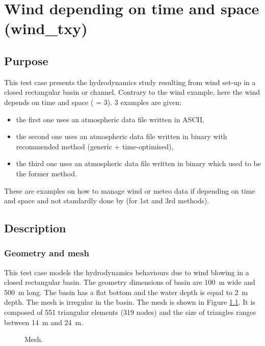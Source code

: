 \chapter{Wind depending on time and space (wind\_txy)}
%
\section{Purpose}

This test case presents the hydrodynamics study resulting from wind set-up in a
closed rectangular basin or channel.
Contrary to the wind example, here the wind depends on time and space
( = 3).
3 examples are given:
\begin{itemize}
\item the first one uses an atmospheric data file written in ASCII,
\item the second one uses an atmospheric data file written in binary
with recommended method (generic + time-optimised),
\item the third one uses an atmospheric data file written in binary
which used to be the former method.
\end{itemize}
These are examples on how to manage wind or meteo data if depending on time
and space and not standardly done by  (for 1st and 3rd methods).

\section{Description}

\subsection{Geometry and mesh}

This test case models the hydrodynamics behaviours due to wind blowing 
in a closed rectangular basin. The geometry dimensions of basin are 100~m wide 
and  500~m long. The basin has a flat bottom and the water depth is equal to 2~m depth. 
The mesh is irregular in the basin. The mesh is shown in Figure \ref{t2d:windtxy:fig:mesh}. 
It is composed of 551 triangular elements (319 nodes) and the size of triangles
ranges between 14~m and 24~m.

\begin{figure}[!htbp]
 \centering
 \caption{Mesh.}
 \label{t2d:windtxy:fig:mesh}
\end{figure}

